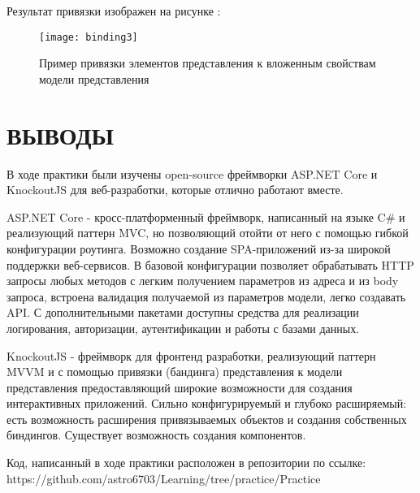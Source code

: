 \documentclass[a4paper,14pt]{extarticle}
\begin{document}
Результат привязки изображен на рисунке :

\begin{figure}[H]
    \centering
    \texttt{[image: binding3]}
    \caption{Пример привязки элементов представления к вложенным свойствам модели представления}
    \label{fig:binding3}
\end{figure}

\section*{ВЫВОДЫ}
В ходе практики были изучены open-source фреймворки ASP.NET Core и KnockoutJS для
веб-разработки, которые отлично работают вместе.

ASP.NET Core - кросс-платформенный фреймворк, написанный на языке C\# и
реализующий паттерн MVC, но позволяющий отойти от него с помощью гибкой
конфигурации роутинга. Возможно создание SPA-приложений из-за широкой
поддержки веб-сервисов. В базовой конфигурации позволяет обрабатывать
HTTP запросы любых методов с легким получением параметров из адреса и
из body запроса, встроена валидация получаемой из параметров модели,
легко создавать API. С дополнительными пакетами доступны средства для
реализации логирования, авторизации, аутентификации и работы с базами
данных.

KnockoutJS - фреймворк для фронтенд разработки, реализующий паттерн
MVVM и с помощью привязки (бандинга) представления к модели представления
предоставляющий широкие возможности для создания интерактивных приложений.
Сильно конфигурируемый и глубоко расширяемый: есть возможность расширения
привязываемых объектов и создания собственных биндингов. Существует
возможность создания компонентов.

Код, написанный в ходе практики расположен в репозитории по ссылке:
https://github.com/astro6703/Learning/tree/practice/Practice
\end{document}

